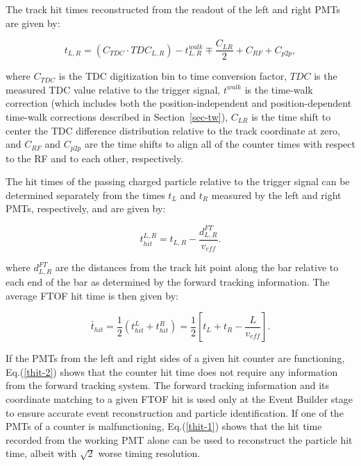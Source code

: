 \documentclass[final,3p,twocolumn]{elsarticle}
\begin{document}
The track hit times reconstructed from the readout of the left and right PMTs are given by:

\begin{equation}
t_{L,R} = (C_{TDC} \cdot TDC_{L,R}) - t_{L,R}^{walk} \mp \frac{C_{LR}}{2} + C_{RF} + C_{p2p},
\end{equation}

\noindent
where $C_{TDC}$ is the TDC digitization bin to time conversion factor, $TDC$ is the measured TDC value
relative to the trigger signal, $t^{walk}$ is the time-walk correction (which includes both the
position-independent and position-dependent time-walk corrections described in Section~\ref{sec-tw}),
$C_{LR}$ is the time shift to center the TDC difference distribution relative to the track coordinate at zero,
and $C_{RF}$ and $C_{p2p}$ are the time shifts to align all of the counter times with respect to the RF and to
each other, respectively.

The hit times of the passing charged particle relative to the trigger signal can be determined separately 
from the times $t_L$ and $t_R$ measured by the left and right PMTs, respectively, and are given by:

\begin{equation}
\label{thit-1}
t_{hit}^{L,R} = t_{L,R} - \frac{d^{FT}_{L,R}}{v_{eff}}.
\end{equation}

\noindent
where $d^{FT}_{L,R}$ are the distances from the track hit point along the bar relative to each end of the
bar as determined by the forward tracking information. The average FTOF hit time is then given by:

\begin{equation}
\label{thit-2}
\bar{t}_{hit} = \frac{1}{2} ( t_{hit}^L + t_{hit}^R ) = \frac{1}{2} \left[ t_L + t_R - \frac{L}{v_{eff}} \right].
\end{equation}

If the PMTs from the left and right sides of a given hit counter are functioning, Eq.(\ref{thit-2}) shows that
the counter hit time does not require any information from the forward tracking system. The forward tracking
information and its coordinate matching to a given FTOF hit is used only at the Event Builder stage to ensure
accurate event reconstruction and particle identification. If one of the PMTs of a counter is malfunctioning,
Eq.(\ref{thit-1}) shows that the hit time recorded from the working PMT alone can be used to reconstruct the
particle hit time, albeit with $\sqrt{2}$ worse timing resolution.
\end{document}
